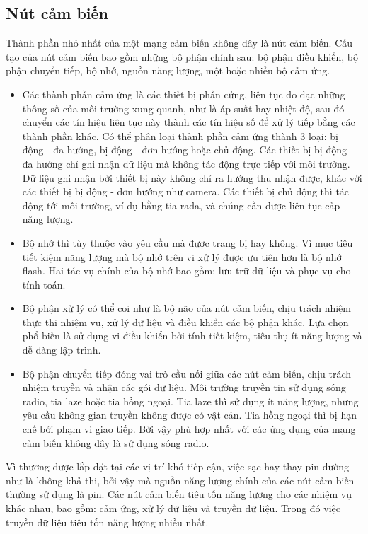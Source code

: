 \documentclass{hust}
\begin{document}
\subsection{Nút cảm biến}
Thành phần nhỏ nhất của một mạng cảm biến không dây là nút cảm biến. Cấu tạo của nút cảm biến bao gồm những bộ phận chính sau: bộ phận điều khiển, bộ phận chuyển tiếp, bộ nhớ, nguồn năng lượng, một hoặc nhiều bộ cảm ứng.
\begin{itemize}
	\item Các thành phần cảm ứng là các thiết bị phần cứng, liên tục đo đạc những thông số của môi trường xung quanh, như là áp suất hay nhiệt độ, sau đó chuyển các tín hiệu liên tục này thành các tín hiệu số để xử lý tiếp bằng các thành phần khác. Có thể phân loại thành phần cảm ứng thành 3 loại: bị động - đa hướng, bị động - đơn hướng hoặc chủ động. Các thiết bị bị động - đa hướng chỉ ghi nhận dữ liệu mà không tác động trực tiếp với môi trường. Dữ liệu ghi nhận bởi thiết bị này không chỉ ra hướng thu nhận được, khác với các thiết bị bị động - đơn hướng như camera. Các thiết bị chủ động thì tác động tới môi trường, ví dụ bằng tia rada, và chúng cần được liên tục cấp năng lượng.
	\item Bộ nhớ thì tùy thuộc vào yêu cầu mà được trang bị hay không. Vì mục tiêu tiết kiệm năng lượng mà bộ nhớ trên vi xử lý được ưu tiên hơn là bộ nhớ flash. Hai tác vụ chính của bộ nhớ bao gồm: lưu trữ dữ liệu và phục vụ cho tính toán.
	\item Bộ phận xử lý có thể coi như là bộ não của nút cảm biến, chịu trách nhiệm thực thi nhiệm vụ, xử lý dữ liệu và điều khiển các bộ phận khác. Lựa chọn phổ biến là sử dụng vi điều khiển bởi tính tiết kiệm, tiêu thụ ít năng lượng và dễ dàng lập trình.
	\item Bộ phận chuyển tiếp đóng vai trò cầu nối giữa các nút cảm biến, chịu trách nhiệm truyền và nhận các gói dữ liệu. Môi trường truyền tin sử dụng sóng radio, tia laze hoặc tia hồng ngoại. Tia laze thì sử dụng ít năng lượng, nhưng yêu cầu không gian truyền không được có vật cản. Tia hồng ngoại thì bị hạn chế bởi phạm vi giao tiếp. Bởi vậy phù hợp nhất với các ứng dụng của mạng cảm biến không dây là sử dụng sóng radio.
\end{itemize}
Vì thương được lắp đặt tại các vị trí khó tiếp cận, việc sạc hay thay pin dường như là không khả thi, bởi vậy mà nguồn năng lượng chính của các nút cảm biến thường sử dụng là pin. Các nút cảm biến tiêu tốn năng lượng cho các nhiệm vụ khác nhau, bao gồm: cảm ứng, xử lý dữ liệu và truyền dữ liệu. Trong đó việc truyền dữ liệu tiêu tốn năng lượng nhiều nhất.
\end{document}
